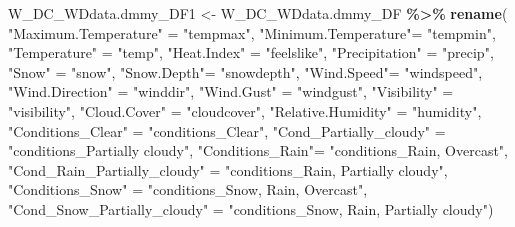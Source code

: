 \documentclass[
]{article}
\newenvironment{Shaded}{\begin{snugshade}}{\end{snugshade}}
\newcommand{\CommentTok}[1]{\textcolor[rgb]{0.56,0.35,0.01}{\textit{#1}}}
\newcommand{\DecValTok}[1]{\textcolor[rgb]{0.00,0.00,0.81}{#1}}
\newcommand{\FunctionTok}[1]{\textcolor[rgb]{0.13,0.29,0.53}{\textbf{#1}}}
\newcommand{\NormalTok}[1]{#1}
\newcommand{\OtherTok}[1]{\textcolor[rgb]{0.56,0.35,0.01}{#1}}
\newcommand{\SpecialCharTok}[1]{\textcolor[rgb]{0.81,0.36,0.00}{\textbf{#1}}}
\newcommand{\StringTok}[1]{\textcolor[rgb]{0.31,0.60,0.02}{#1}}
\begin{document}
\begin{Shaded}
\begin{Highlighting}[]
\NormalTok{W\_DC\_WDdata.dmmy\_DF1 }\OtherTok{\textless{}{-}}\NormalTok{ W\_DC\_WDdata.dmmy\_DF }\SpecialCharTok{\%\textgreater{}\%} 
        \FunctionTok{rename}\NormalTok{( }
          \StringTok{"Maximum.Temperature"} \OtherTok{=} \StringTok{"tempmax"}\NormalTok{,}
          \StringTok{"Minimum.Temperature"}\OtherTok{=} \StringTok{"tempmin"}\NormalTok{,}
          \StringTok{"Temperature"} \OtherTok{=} \StringTok{"temp"}\NormalTok{,}
          \StringTok{"Heat.Index"} \OtherTok{=} \StringTok{"feelslike"}\NormalTok{,}
          \StringTok{"Precipitation"} \OtherTok{=} \StringTok{"precip"}\NormalTok{,}
          \StringTok{"Snow"} \OtherTok{=} \StringTok{"snow"}\NormalTok{,}
          \StringTok{"Snow.Depth"}\OtherTok{=} \StringTok{"snowdepth"}\NormalTok{,}
          \StringTok{"Wind.Speed"}\OtherTok{=} \StringTok{"windspeed"}\NormalTok{,}
          \StringTok{"Wind.Direction"} \OtherTok{=} \StringTok{"winddir"}\NormalTok{,}
          \StringTok{"Wind.Gust"} \OtherTok{=} \StringTok{"windgust"}\NormalTok{,}
          \StringTok{"Visibility"} \OtherTok{=} \StringTok{"visibility"}\NormalTok{,}
          \StringTok{"Cloud.Cover"} \OtherTok{=} \StringTok{"cloudcover"}\NormalTok{,}
          \StringTok{"Relative.Humidity"} \OtherTok{=} \StringTok{"humidity"}\NormalTok{,}
          \StringTok{"Conditions\_Clear"} \OtherTok{=} \StringTok{"conditions\_Clear"}\NormalTok{,}
          \StringTok{"Cond\_Partially\_cloudy"} \OtherTok{=} \StringTok{"conditions\_Partially cloudy"}\NormalTok{,}
          \StringTok{"Conditions\_Rain"}\OtherTok{=} \StringTok{"conditions\_Rain, Overcast"}\NormalTok{,}
          \StringTok{"Cond\_Rain\_Partially\_cloudy"} \OtherTok{=} \StringTok{"conditions\_Rain, Partially cloudy"}\NormalTok{,}
          \StringTok{"Conditions\_Snow"} \OtherTok{=} \StringTok{"conditions\_Snow, Rain, Overcast"}\NormalTok{,}
          \StringTok{"Cond\_Snow\_Partially\_cloudy"} \OtherTok{=} \StringTok{"conditions\_Snow, Rain, Partially cloudy"}\NormalTok{)}
\end{Highlighting}
\end{Shaded}

\begin{Shaded}
\end{Shaded}
\end{document}
